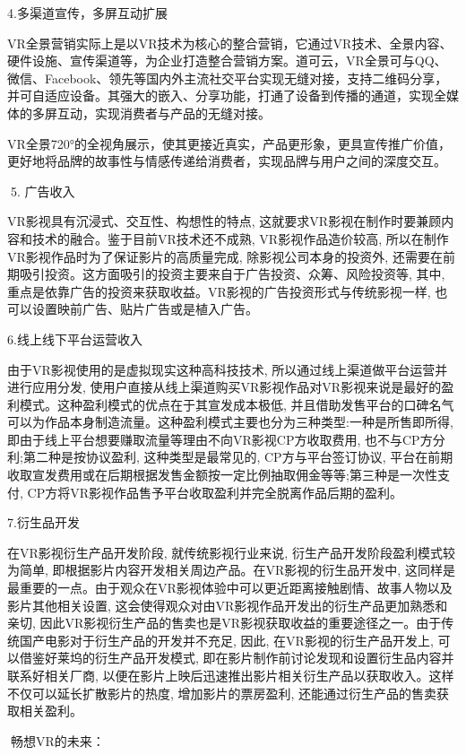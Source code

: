 \documentclass{article}
\begin{document}
4.多渠道宣传，多屏互动扩展\par
VR全景营销实际上是以VR技术为核心的整合营销，它通过VR技术、全景内容、硬件设施、宣传渠道等，为企业打造整合营销方案。道可云，VR全景可与QQ、微信、Facebook、领先等国内外主流社交平台实现无缝对接，支持二维码分享，并可自适应设备。其强大的嵌入、分享功能，打通了设备到传播的通道，实现全媒体的多屏互动，实现消费者与产品的无缝对接。\par
VR全景720°的全视角展示，使其更接近真实，产品更形象，更具宣传推广价值，更好地将品牌的故事性与情感传递给消费者，实现品牌与用户之间的深度交互。\par
5. 广告收入\par
VR影视具有沉浸式、交互性、构想性的特点, 这就要求VR影视在制作时要兼顾内容和技术的融合。鉴于目前VR技术还不成熟, VR影视作品造价较高, 所以在制作VR影视作品时为了保证影片的高质量完成, 除影视公司本身的投资外, 还需要在前期吸引投资。这方面吸引的投资主要来自于广告投资、众筹、风险投资等, 其中, 重点是依靠广告的投资来获取收益。VR影视的广告投资形式与传统影视一样, 也可以设置映前广告、贴片广告或是植入广告。\par
6.线上线下平台运营收入\par
由于VR影视使用的是虚拟现实这种高科技技术, 所以通过线上渠道做平台运营并进行应用分发, 使用户直接从线上渠道购买VR影视作品对VR影视来说是最好的盈利模式。这种盈利模式的优点在于其宣发成本极低, 并且借助发售平台的口碑名气可以为作品本身制造流量。这种盈利模式主要也分为三种类型:一种是所售即所得, 即由于线上平台想要赚取流量等理由不向VR影视CP方收取费用, 也不与CP方分利;第二种是按协议盈利, 这种类型是最常见的, CP方与平台签订协议, 平台在前期收取宣发费用或在后期根据发售金额按一定比例抽取佣金等等;第三种是一次性支付, CP方将VR影视作品售予平台收取盈利并完全脱离作品后期的盈利。\par
7.衍生品开发\par
在VR影视衍生产品开发阶段, 就传统影视行业来说, 衍生产品开发阶段盈利模式较为简单, 即根据影片内容开发相关周边产品。在VR影视的衍生品开发中, 这同样是最重要的一点。由于观众在VR影视体验中可以更近距离接触剧情、故事人物以及影片其他相关设置, 这会使得观众对由VR影视作品开发出的衍生产品更加熟悉和亲切, 因此VR影视衍生产品的售卖也是VR影视获取收益的重要途径之一。由于传统国产电影对于衍生产品的开发并不充足, 因此, 在VR影视的衍生产品开发上, 可以借鉴好莱坞的衍生产品开发模式, 即在影片制作前讨论发现和设置衍生品内容并联系好相关厂商, 以便在影片上映后迅速推出影片相关衍生产品以获取收入。这样不仅可以延长扩散影片的热度, 增加影片的票房盈利, 还能通过衍生产品的售卖获取相关盈利。\par
畅想VR的未来：\par
\end{document}
